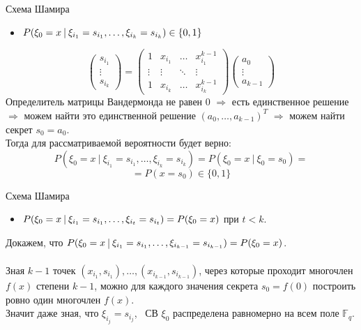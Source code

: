 \documentclass{beamer}
\begin{document}
\begin{frame}{Схема Шамира}
\begin{itemize}
        \item \(P(\xi_0 = x \ \vline \ \xi_{i_1} = s_{i_1}, \dots, \xi_{i_k} = s_{i_k}) \in \{ 0, 1 \} \)
    \end{itemize}
    \[
    \begin{pmatrix}
        s_{i_1} \\ \vdots \\ s_{i_k}
    \end{pmatrix} = \begin{pmatrix}
        1 & x_{i_1} & \dots & x_{i_1}^{k - 1} \\
        \vdots & \vdots & \ddots & \vdots \\
        1 & x_{i_k} & \dots & x_{i_k}^{k - 1}
    \end{pmatrix} \begin{pmatrix}
        a_0 \\ \vdots \\ a_{k - 1}
    \end{pmatrix}
    \]
    Определитель матрицы Вандермонда не равен 0 \(\Longrightarrow\) есть единственное решение \( \Longrightarrow\) можем найти это единственной решение \((a_0, \dots, a_{k - 1})^T\) \(\Longrightarrow\) можем найти секрет \(s_0 = a_0\). \\
    Тогда для рассматриваемой вероятности будет верно:
    \[
    P(\xi_0 = x \ | \ \xi_{i_1} = s_{i_1}, \dots, \xi_{i_k} = s_{i_k}) = P(\xi_0 = x \ | \ \xi_0 = s_0) = 
    \]
    \[
    = P(x = s_0) \in \{ 0, 1 \}
    \]
\end{frame}

\begin{frame}{Схема Шамира}
    \begin{itemize}
        \item \(P(\xi_0 = x \ \vline \ \xi_{i_1} = s_{i_1}, \dots, \xi_{i_t} = s_{i_t}) = P(\xi_0 = x) \) при \(t < k\).
    \end{itemize}
    Докажем, что \(P(\xi_0 = x \ \vline \ \xi_{i_1} = s_{i_1}, \dots, \xi_{i_{k - 1}} = s_{i_{k - 1}}) = P(\xi_0 = x)\). \\ \ \\
    Зная \(k - 1\) точек \((x_{i_1}, s_{i_1}), \dots, (x_{i_{k - 1}}, s_{i_{k - 1}})\), через которые проходит многочлен \(f(x)\) степени \(k - 1\), можно для каждого значения секрета \(s_0 = f(0)\) построить ровно один многочлен \(f(x)\). \\
    Значит даже зная, что \(\xi_{i_j} = s_{i_j}\), \ СВ \(\xi_0\) распределена равномерно на всем поле \(\mathbb{F}_q\).
    
\end{frame}
\end{document}
